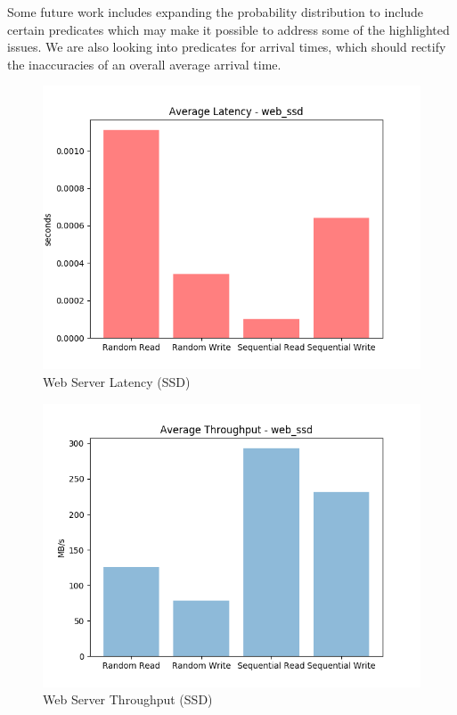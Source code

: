 \documentclass[10pt, author, twocolumn]{article}
\begin{document}
Some future work includes expanding the probability distribution to include certain predicates which may make it possible to address some of the highlighted issues. We are also looking into predicates for arrival times, which should rectify the inaccuracies of an overall average arrival time.

\newpage
\begin{figure}[t!]
    \includegraphics[scale=0.5]{../graphs/web_ssd-lat.png}
    \caption{Web Server Latency (SSD)}
    \label{fig:ssd_web_lat}
\end{figure}

\begin{figure}[h!]
    \includegraphics[scale=0.5]{../graphs/web_ssd-thru.png}
    \caption{Web Server Throughput (SSD)}
    \label{fig:ssd_web_thru}
\end{figure}
\end{document}
